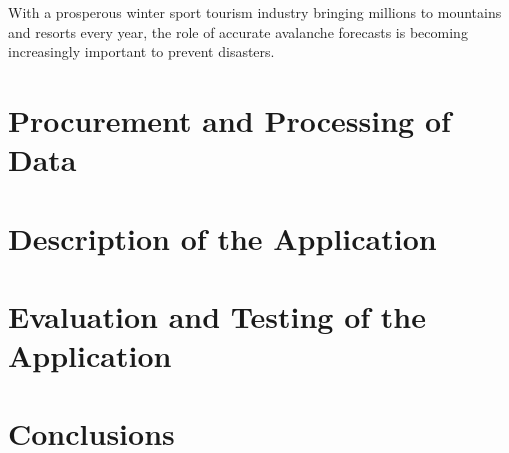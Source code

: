 \documentclass[openany]{UoYCSproject}
\begin{document}
With a prosperous winter sport tourism industry bringing millions to mountains and resorts every year\cite{hudson2003sport}, the role of accurate avalanche forecasts is becoming increasingly important to prevent disasters.

\chapter{Procurement and Processing of Data} \label{ch:data}

\chapter{Description of the Application} \label{ch:app-description}

\chapter{Evaluation and Testing of the Application} \label{ch:app-testing}

\chapter{Conclusions} \label{ch:conclusions}

\small{}
\end{document}
